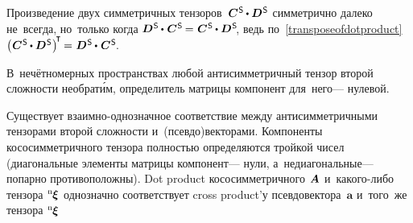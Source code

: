 Произведение двух симметричных тензоров~${\bm{C}^{\mathsf{\hspace{.1ex}S}} \hspace{-0.1ex}\dotp \bm{D}^{\mathsf{\hspace{.1ex}S}}}$ симметрично далеко не~всегда, но~только когда ${\bm{D}^{\mathsf{\hspace{.1ex}S}} \hspace{-0.1ex}\dotp\hspace{.12ex} \bm{C}^{\mathsf{\hspace{.1ex}S}} \hspace{-0.2ex}=\hspace{.1ex} \bm{C}^{\mathsf{\hspace{.1ex}S}} \hspace{-0.1ex}\dotp \bm{D}^{\mathsf{\hspace{.1ex}S}}\hspace{-0.4ex}}$,
ведь по~\eqref{transposeofdotproduct} ${\left(\hspace{.08ex} \bm{C}^{\mathsf{\hspace{.1ex}S}} \hspace{-0.1ex}\dotp \bm{D}^{\mathsf{\hspace{.1ex}S}} \hspace{.1ex}\right)^{\hspace{-0.32ex}\T} \hspace{-0.16ex} = \hspace{.1ex} \bm{D}^{\mathsf{\hspace{.1ex}S}} \hspace{-0.1ex}\dotp\hspace{.12ex} \bm{C}^{\mathsf{\hspace{.1ex}S}} \hspace{-0.4ex}}$.






В~нечётномерных пространствах любой антисимметричный тензор второй сложности необрат\'{и}м, определитель матрицы компонент для~него\:--- нулевой.

Существует взаимно\hbox{-}однозначное соответствие между антисимметричными тензорами второй сложности и~(псевдо)векторами. Компоненты кососимметричного тензора полностью определяются тройкой чисел (диагональные элементы матрицы компонент\:--- нули, а~недиагональные\:--- попарно противоположны). Dot product кососимметричного~${\hspace{-0.2ex}\bm{A}}$ и~какого\hbox{-}либо тензора~${\hspace{-0.2ex}{^\mathrm{n}\hspace{-0.12ex}\bm{\xi}}}$ однозначно соответствует cross product’у псевдовектора~$\bm{a}$ и~того~же тензора~${\hspace{-0.2ex}{^\mathrm{n}\hspace{-0.12ex}\bm{\xi}}}$

